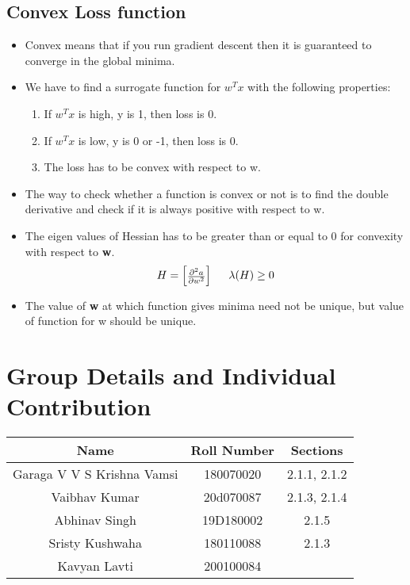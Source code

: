 \documentclass[11pt, twosides]{article}
\begin{document}
\subsection{Convex Loss function }
\begin{itemize}
    \item Convex means that if you run gradient descent then it is guaranteed to converge in the global minima.
    \item We have to find a surrogate function for $w^{T}x$ with the following properties:
    \begin{enumerate}
    \item If $w^{T}x$ is high, y is 1, then loss is 0.
    \item If $w^{T}x$ is low, y is 0 or -1, then loss is 0.
    \item The loss has to be convex with respect to w.
    \end{enumerate}
\item The way to check whether a function is convex or not is to find the double derivative and check if it is always positive with respect to w.
\item The eigen values of Hessian has to be greater than or equal to 0 for convexity with respect to \textbf{w}.
\begin{equation*}
H =
\begin{bmatrix}
\frac{\partial^2 a}{\partial w^2} 
\end{bmatrix}
\hspace{5mm} 
\lambda(H) \geq 0
\end{equation*}
\item The value of \textbf{w} at which function gives minima need not be unique, but value of function for w should be unique.
\end{itemize}
\section{Group Details and Individual Contribution}
\begin{center}
    \begin{tabular}{|c|c|c|}
    \hline
    \textbf{Name}& \textbf{Roll Number} & \textbf{Sections}\\
    \hline
    Garaga V V S Krishna Vamsi & 180070020 & 2.1.1, 2.1.2\\
    \hline
    Vaibhav Kumar & 20d070087 & 2.1.3, 2.1.4\\
    \hline
    Abhinav Singh & 19D180002 & 2.1.5\\
    \hline
    Sristy Kushwaha & 180110088 & 2.1.3\\
    \hline
    Kavyan Lavti & 200100084 & \\
    \hline
    
    \end{tabular}
\end{center}
\end{document}
